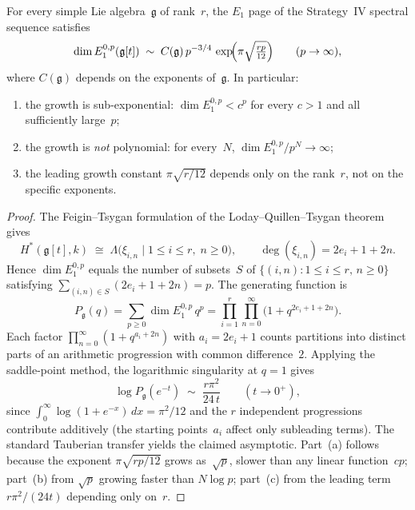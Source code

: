 \begin{proposition}
\label{prop:lqt-e1-subexponential-growth}
For every simple Lie algebra~$\mathfrak{g}$ of rank~$r$,
the $E_1$ page of the Strategy~IV spectral sequence satisfies
\[
\dim E_1^{0,p}(\mathfrak{g}[t])
\;\sim\;
C(\mathfrak{g})\,p^{-3/4}\,
\exp\!\Bigl(\pi\sqrt{\tfrac{rp}{12}}\Bigr)
\qquad (p \to \infty),
\]
where $C(\mathfrak{g})$ depends on the exponents of~$\mathfrak{g}$.
In particular:
\begin{enumerate}[label=\textup{(\alph*)}]
\item the growth is sub-exponential: $\dim E_1^{0,p} < c^p$
 for every $c > 1$ and all sufficiently large~$p$;
\item the growth is \emph{not} polynomial: for every~$N$,
 $\dim E_1^{0,p} / p^N \to \infty$;
\item the leading growth constant $\pi\sqrt{r/12}$ depends
 only on the rank~$r$, not on the specific exponents.
\end{enumerate}
\end{proposition}

\begin{proof}
The Feigin--Tsygan formulation of the
Loday--Quillen--Tsygan theorem gives
\[
H^*(\mathfrak{g}[t], k)
\;\cong\;
\Lambda\bigl(\xi_{i,n} \mid
 1 \le i \le r,\; n \ge 0\bigr),
\qquad
\deg(\xi_{i,n}) = 2e_i + 1 + 2n.
\]
Hence $\dim E_1^{0,p}$ equals the number of subsets~$S$ of
$\{(i,n) : 1 \le i \le r,\, n \ge 0\}$ satisfying
$\sum_{(i,n) \in S} (2e_i + 1 + 2n) = p$.
The generating function is
\[
P_{\mathfrak{g}}(q)
= \sum_{p \ge 0} \dim E_1^{0,p}\, q^p
= \prod_{i=1}^{r} \prod_{n=0}^{\infty}
 \bigl(1 + q^{2e_i + 1 + 2n}\bigr).
\]
Each factor $\prod_{n=0}^{\infty}(1 + q^{a_i + 2n})$ with
$a_i = 2e_i + 1$ counts partitions into distinct parts of an
arithmetic progression with common difference~$2$. Applying
the saddle-point method, the logarithmic singularity at
$q = 1$ gives
\[
\log P_{\mathfrak{g}}(e^{-t})
\;\sim\; \frac{r\pi^2}{24\,t}
\qquad (t \to 0^+),
\]
since $\int_0^\infty \log(1 + e^{-x})\,dx = \pi^2/12$ and the $r$
independent progressions contribute additively (the starting
points~$a_i$ affect only subleading terms). The standard
Tauberian transfer yields the claimed asymptotic.
Part~(a) follows because the exponent $\pi\sqrt{rp/12}$ grows
as~$\sqrt{p}$, slower than any linear function~$cp$;
part~(b) from $\sqrt{p}$ growing faster than $N\log p$;
part~(c) from the leading term $r\pi^2/(24t)$ depending only
on~$r$.
\end{proof}


